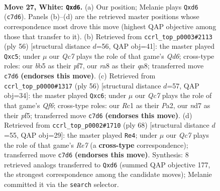 \documentclass[11pt]{article}
\begin{document}
\clearpage

\begin{figure}[p]\centering
\begin{subfigure}{0.46\textwidth}\centering
\resizebox{\linewidth}{!}{%
\newchessgame
\chessboard[
  setfen={r3k3/2Qn4/3p4/pb1Ppp2/6p1/8/PPP2PP1/2R1K3 w q - 1 27},
  showmover=false,
  pgfstyle=straightmove, color=movearrow, markmove={c7-d6}
]}
\caption{}
\end{subfigure}\hfill
\begin{subfigure}{0.46\textwidth}\centering
\resizebox{\linewidth}{!}{%
\newchessgame
\chessboard[
  setfen={q3k2r/5p2/3Q4/1pnpP2p/2p2p2/2P5/6PP/5RK1 w - - 4 29},
  showmover=false,
  pgfstyle=straightmove, color=movearrow, markmove={d6-c5}
]}
\caption{}
\end{subfigure}
\\[4pt]
\begin{subfigure}{0.46\textwidth}\centering
\resizebox{\linewidth}{!}{%
\newchessgame
\chessboard[
  setfen={4r1k1/3r1p2/2p2Qp1/p1P2p1p/8/6P1/PP3P1P/6K1 w - - 0 29},
  showmover=false,
  pgfstyle=straightmove, color=movearrow, markmove={f6-c6}
]}
\caption{}
\end{subfigure}\hfill
\begin{subfigure}{0.46\textwidth}\centering
\resizebox{\linewidth}{!}{%
\newchessgame
\chessboard[
  setfen={3r2k1/3nR1p1/p2P3p/1p6/1P6/P7/2P2b1P/1K1R4 w - - 1 35},
  showmover=false,
  pgfstyle=straightmove, color=movearrow, markmove={e7-e4}
]}
\caption{}
\end{subfigure}
\caption{\textbf{Move 27, White: \texttt{Qxd6}.} (a) Our position; Melanie plays \texttt{Qxd6} (\texttt{c7d6}). Panels (b)--(d) are the retrieved master positions whose correspondence most drove this move (highest QAP objective among those that transfer to it). (b) Retrieved from \texttt{ccrl\_top\_p0003\#2113} (ply 56) [structural distance $d$=56, QAP obj=41]: the master played \texttt{Qxc5}; under $\mu$ our \emph{Qc7} plays the role of that game's \emph{Qd6}; cross-type roles: our \emph{b}b5 as their \emph{p}f7, our \emph{r}a8 as their \emph{q}a8; transferred move \texttt{c7d6} \textbf{(endorses this move)}. (c) Retrieved from \texttt{ccrl\_top\_p0000\#1317} (ply 56) [structural distance $d$=57, QAP obj=34]: the master played \texttt{Qxc6}; under $\mu$ our \emph{Qc7} plays the role of that game's \emph{Qf6}; cross-type roles: our \emph{R}c1 as their \emph{P}a2, our \emph{n}d7 as their \emph{p}f5; transferred move \texttt{c7d6} \textbf{(endorses this move)}. (d) Retrieved from \texttt{ccrl\_top\_p0002\#1710} (ply 68) [structural distance $d$=55, QAP obj=29]: the master played \texttt{Re4}; under $\mu$ our \emph{Qc7} plays the role of that game's \emph{Re7} (a \textbf{cross-type} correspondence); transferred move \texttt{c7d6} \textbf{(endorses this move)}. Synthesis: 8 retrieved analogs transferred to \texttt{Qxd6} (summed QAP objective 177, the strongest correspondence among the candidate moves); Melanie committed it via the \texttt{search} selector.}
\label{fig:thought-m52}
\end{figure}
\end{document}
